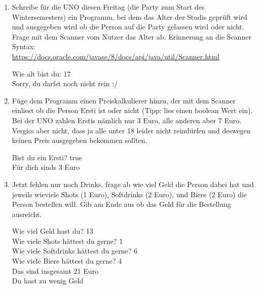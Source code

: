 \documentclass{../../sheet}
\begin{document}
\begin{enumerate}
    \item Schreibe für die UNO diesen Freitag (die Party zum Start des Wintersemesters) ein Programm, bei dem das Alter der Studis geprüft wird und ausgegeben wird ob die Person auf die Party gelassen wird oder nicht. Frage mit dem Scanner vom Nutzer das Alter ab. Erinnerung an die Scanner Syntax:\\ \url{https://docs.oracle.com/javase/8/docs/api/java/util/Scanner.html}
    \begin{ausgabe}
        Wie alt bist du: 17\\
        Sorry, du darfst noch nicht rein :/
    \end{ausgabe}
    \item Füge dem Programm einen Preiskalkulierer hinzu, der mit dem Scanner einliest ob die Person Ersti ist oder nicht (Tipp: lies einen boolean Wert ein). Bei der UNO zahlen Erstis nämlich nur 3 Euro, alle anderen aber 7 Euro. Vergiss aber nicht, dass ja alle unter 18 leider nicht reindürfen und deswegen keinen Preis ausgegeben bekommen sollten.
    \begin{ausgabe}
        Bist du ein Ersti? true\\
        Für dich sinds 3 Euro
    \end{ausgabe}
    \item Jetzt fehlen nur noch Drinks, frage ab wie viel Geld die Person dabei hat und jeweils wieviele Shots (1 Euro), Softdrinks (2 Euro), und Biere (2 Euro) die Person bestellen will. Gib am Ende aus ob das Geld für die Bestellung ausreicht.
    \begin{ausgabe}
        Wie viel Geld hast du? 13\\
        Wie viele Shots hättest du gerne? 1\\
        Wie viele Softdrinks hättest du gerne? 6\\
        Wie viele Biere hättest du gerne? 4\\
        Das sind insgesamt 21 Euro\\
        Du hast zu wenig Geld
    \end{ausgabe}
\end{enumerate}
\end{document}
